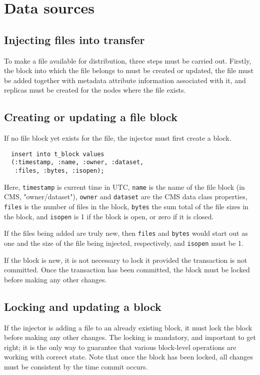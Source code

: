 \documentclass{cmspaper}
\begin{document}
\section{Data sources}

\subsection{Injecting files into transfer}

To make a file available for distribution, three steps must be carried out.  Firstly, the block into which the file belongs to must be created or updated, the file must be added together with metadata attribute information associated with it, and replicas must be created for the nodes where the file exists.

\subsection{Creating or updating a file block}

If no file block yet exists for the file, the injector must first create a block.

{\small\begin{verbatim}
  insert into t_block values
  (:timestamp, :name, :owner, :dataset,
   :files, :bytes, :isopen);
\end{verbatim}}

Here, \texttt{timestamp} is current time in UTC, \texttt{name} is the name of the file block (in CMS, "owner/dataset"), \texttt{owner} and \texttt{dataset} are the CMS data class properties, \texttt{files} is the number of files in the block, \texttt{bytes} the sum total of the file sizes in the block, and \texttt{isopen} is 1 if the block is open, or zero if it is closed.

If the files being added are truly new, then \texttt{files} and \texttt{bytes} would start out as one and the size of the file being injected, respectively, and \texttt{isopen} must be 1.

If the block is new, it is not necessary to lock it provided the transaction is not committed.  Once the transaction has been committed, the block must be locked before making any other changes.

\subsection{Locking and updating a block}

If the injector is adding a file to an already existing block, it must lock the block before making any other changes.  The locking is mandatory, and important to get right; it is the only way to guarantee that various block-level operations are working with correct state.  Note that once the block has been locked, all changes must be consistent by the time commit occurs.
\end{document}

